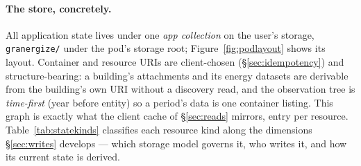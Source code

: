 \documentclass[11pt,a4paper]{article}
\theoremstyle{remark}
\newcommand{\code}[1]{\texttt{#1}}
\begin{document}
\paragraph{The store, concretely.} All application state lives under one
\emph{app collection} on the user's storage, \code{granergize/} under the
pod's storage root; Figure~\ref{fig:podlayout} shows its layout. Container and resource URIs are
client-chosen (\S\ref{sec:idempotency}) and structure-bearing: a building's
attachments and its energy datasets are derivable from the building's own URI
without a discovery read, and the observation tree is \emph{time-first}
(year before entity) so a period's data is one container listing. This graph
is exactly what the client cache of \S\ref{sec:reads} mirrors, entry per
resource. Table~\ref{tab:statekinds} classifies each resource kind along the
dimensions \S\ref{sec:writes} develops --- which storage model governs it, who
writes it, and how its current state is derived.
\end{document}

